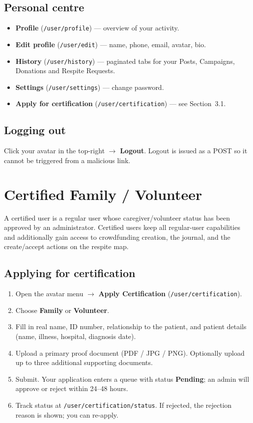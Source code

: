 \subsection{Personal centre}
\begin{itemize}
  \item \textbf{Profile} (\texttt{/user/profile}) — overview of your
        activity.
  \item \textbf{Edit profile} (\texttt{/user/edit}) — name, phone,
        email, avatar, bio.
  \item \textbf{History} (\texttt{/user/history}) — paginated tabs for
        your Posts, Campaigns, Donations and Respite Requests.
  \item \textbf{Settings} (\texttt{/user/settings}) — change password.
  \item \textbf{Apply for certification} (\texttt{/user/certification})
        — see Section~3.1.
\end{itemize}

\subsection{Logging out}
Click your avatar in the top-right $\to$ \textbf{Logout}. Logout is
issued as a POST so it cannot be triggered from a malicious link.

\section{Certified Family / Volunteer}

A certified user is a regular user whose caregiver/volunteer status has
been approved by an administrator. Certified users keep all
regular-user capabilities and additionally gain access to crowdfunding
creation, the journal, and the create/accept actions on the respite
map.

\subsection{Applying for certification}
\begin{enumerate}
  \item Open the avatar menu $\to$ \textbf{Apply Certification}
        (\texttt{/user/certification}).
  \item Choose \textbf{Family} or \textbf{Volunteer}.
  \item Fill in real name, ID number, relationship to the patient, and
        patient details (name, illness, hospital, diagnosis date).
  \item Upload a primary proof document (PDF / JPG / PNG). Optionally
        upload up to three additional supporting documents.
  \item Submit. Your application enters a queue with status
        \textbf{Pending}; an admin will approve or reject within
        24–48 hours.
  \item Track status at \texttt{/user/certification/status}. If
        rejected, the rejection reason is shown; you can re-apply.
\end{enumerate}

